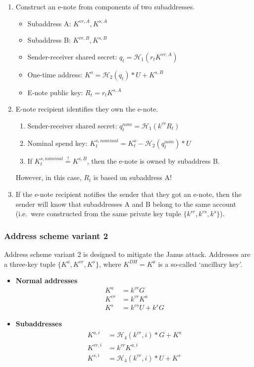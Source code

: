 \begin{enumerate}
    \item Construct an e-note from components of two subaddresses.
    \begin{itemize}
        \item Subaddress A: $K^{vr,A}, K^{s,A}$
        \item Subaddress B: $K^{vr,B}, K^{s,B}$
        \item Sender-receiver shared secret: $q_t = \mathcal{H}_1(r_t K^{vr,A})$
        \item One-time address: $K^o = \mathcal{H}_2(q_t)*U + K^{s,B}$
        \item E-note public key: $R_t = r_t K^{s,A}$
    \end{itemize}

    \item E-note recipient identifies they own the e-note.
    \begin{enumerate}
        \item Sender-receiver shared secret: $q^{nom}_t = \mathcal{H}_1(k^{vr} R_t)$
        \item Nominal spend key: $K^{s,nominal}_t = K^o_t - \mathcal{H}_2(q^{nom}_t)*U$
        \item If $K^{s,nominal}_t \stackrel{?}{=} K^{s,B}$, then the e-note is owned by subaddress B.
    \end{enumerate}
    
    However, in this case, $R_t$ is based on subaddress A!

    \item If the e-note recipient notifies the sender that they got an e-note, then the sender will know that subaddresses A and B belong to the same account (i.e.\ were constructed from the same private key tuple $\{k^{vr}, k^{vs}, k^s\}$).
\end{enumerate}

\subsubsection{Address scheme variant 2}

Address scheme variant 2 is designed to mitigate the Janus attack. Addresses are a three-key tuple $\{K^a, K^{vr}, K^s\}$, where $K^{DH} = K^a$ is a so-called `ancillary key'.

\begin{itemize}
    \item \textbf{Normal addresses}
    \begin{align*}
        K^a &= k^{vr} G  \\
        K^{vr} &= k^{vr} K^a  \\
        K^{s} &= k^{vs} U + k^s G
    \end{align*}

    \item \textbf{Subaddresses}
    \begin{align*}
        K^{a,i} &= \mathcal{H}_4(k^{vr},i)*G + K^a  \\
        K^{vr,i} &= k^{vr} K^{a,i}  \\
        K^{s,i} &= \mathcal{H}_4(k^{vr},i)*U + K^s
    \end{align*}
\end{itemize}

